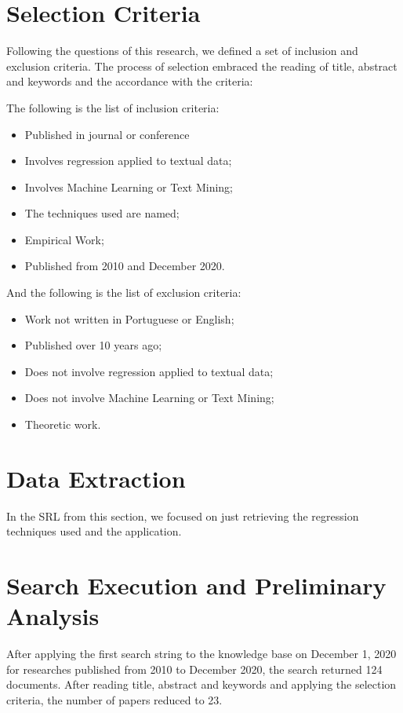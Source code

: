 \section{Selection Criteria}

Following the questions of this research, we defined a set of inclusion and exclusion criteria. The process of selection embraced the reading of title, abstract and keywords and the accordance with the criteria:

The following is the list of inclusion criteria:

\begin{itemize}[noitemsep]
    \item Published in journal or conference
    \item Involves regression applied to textual data;
    \item Involves Machine Learning or Text Mining;
    \item The techniques used are named;
    \item Empirical Work;
    \item Published from 2010 and December 2020.
\end{itemize}

And the following is the list of exclusion criteria:

\begin{itemize}[noitemsep]
    \item Work not written in Portuguese or English;
    \item Published over 10 years ago;
    \item Does not involve regression applied to textual data;
    \item Does not involve Machine Learning or Text Mining;
    \item Theoretic work.
\end{itemize}

\section{Data Extraction}
In the SRL from this section, we focused on just retrieving the regression techniques used and the application.

\section{Search Execution and Preliminary Analysis}

After applying the first search string to the knowledge base on December 1, 2020 for researches published from 2010 to December 2020, the search returned 124 documents. After reading title, abstract and keywords and applying the selection criteria, the number of papers reduced to 23.

